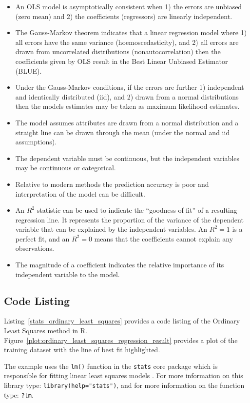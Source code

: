 \begin{itemize}
	\item An OLS model is asymptotically consistent when 1) the errors are unbiased (zero mean) and 2) the coefficients (regressors) are linearly independent.
	\item The Gauss-Markov theorem indicates that a linear regression model where 1) all errors have the same variance (hoemoscedasticity), and 2) all errors are drawn from uncorrelated distributions (nonautocorrelation) then the coefficients given by OLS result in the Best Linear Unbiased Estimator (BLUE).
	\item Under the Gauss-Markov conditions, if the errors are further 1) independent and identically distributed (iid), and 2) drawn from a normal distributions then the models estimates may be taken as maximum likelihood estimates.
	\item The model assumes attributes are drawn from a normal distribution and a straight line can be drawn through the mean (under the normal and iid assumptions).
	\item The dependent variable must be continuous, but the independent variables may be continuous or categorical.
	\item Relative to modern methods the prediction accuracy is poor and interpretation of the model can be difficult.
	\item An $R^2$ statistic can be used to indicate the ``goodness of fit'' of a resulting regression line. It represents the proportion of the variance of the dependent variable that can be explained by the independent variables. An $R^2=1$ is a perfect fit, and an $R^2=0$ means that the coefficients cannot explain any observations.
	\item The magnitude of a coefficient indicates the relative importance of its independent variable to the model.
\end{itemize}


\subsection{Code Listing}
Listing~\ref{stats_ordinary_least_squares} provides a code listing of the Ordinary Least Squares method in R. Figure~\ref{plot:ordinary_least_squares_regression_result} provides a plot of the training dataset with the line of best fit highlighted.

The example uses the \texttt{lm()} function in the \texttt{stats} core package which is responsible for fitting linear least squares models \cite{RDCT2011a}. For more information on this library type: \texttt{library(help="stats")}, and for more information on the function type: \texttt{?lm}.

